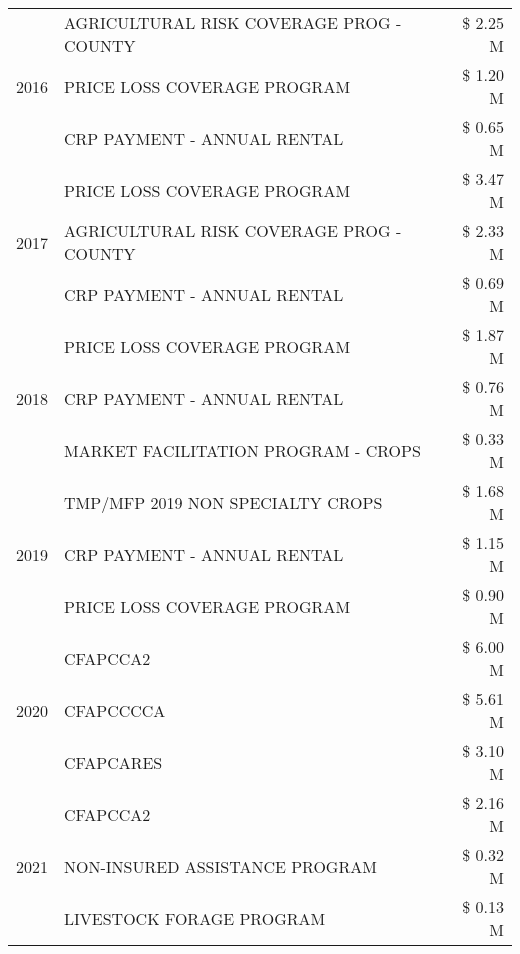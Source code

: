 \begin{tabular}{llr}
\cline{1-3}
\multirow[t]{3}{*}{2016} & AGRICULTURAL RISK COVERAGE PROG - COUNTY & \$ 2.25 M \\
 & PRICE LOSS COVERAGE PROGRAM & \$ 1.20 M \\
 & CRP PAYMENT - ANNUAL RENTAL & \$ 0.65 M \\
\cline{1-3}
\multirow[t]{3}{*}{2017} & PRICE LOSS COVERAGE PROGRAM & \$ 3.47 M \\
 & AGRICULTURAL RISK COVERAGE PROG - COUNTY & \$ 2.33 M \\
 & CRP PAYMENT - ANNUAL RENTAL & \$ 0.69 M \\
\cline{1-3}
\multirow[t]{3}{*}{2018} & PRICE LOSS COVERAGE PROGRAM & \$ 1.87 M \\
 & CRP PAYMENT - ANNUAL RENTAL & \$ 0.76 M \\
 & MARKET FACILITATION PROGRAM - CROPS & \$ 0.33 M \\
\cline{1-3}
\multirow[t]{3}{*}{2019} & TMP/MFP 2019 NON SPECIALTY CROPS & \$ 1.68 M \\
 & CRP PAYMENT - ANNUAL RENTAL & \$ 1.15 M \\
 & PRICE LOSS COVERAGE PROGRAM & \$ 0.90 M \\
\cline{1-3}
\multirow[t]{3}{*}{2020} & CFAPCCA2 & \$ 6.00 M \\
 & CFAPCCCCA & \$ 5.61 M \\
 & CFAPCARES & \$ 3.10 M \\
\cline{1-3}
\multirow[t]{3}{*}{2021} & CFAPCCA2 & \$ 2.16 M \\
 & NON-INSURED ASSISTANCE PROGRAM & \$ 0.32 M \\
 & LIVESTOCK FORAGE PROGRAM & \$ 0.13 M \\
\cline{1-3}
\bottomrule
\end{tabular}
